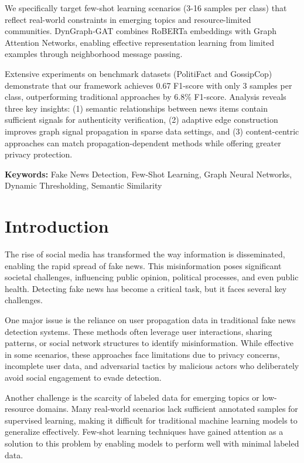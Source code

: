 \documentclass[conference]{IEEEtran}
\begin{document}
    We specifically target few-shot learning scenarios (3-16 samples per class) that reflect real-world constraints in emerging topics and resource-limited communities. DynGraph-GAT combines RoBERTa embeddings with Graph Attention Networks, enabling effective representation learning from limited examples through neighborhood message passing. 
    
    Extensive experiments on benchmark datasets (PolitiFact and GossipCop) demonstrate that our framework achieves 0.67 F1-score with only 3 samples per class, outperforming traditional approaches by 6.8\% F1-score. Analysis reveals three key insights: (1) semantic relationships between news items contain sufficient signals for authenticity verification, (2) adaptive edge construction improves graph signal propagation in sparse data settings, and (3) content-centric approaches can match propagation-dependent methods while offering greater privacy protection.
    
\textbf{Keywords:} Fake News Detection, Few-Shot Learning, Graph Neural Networks, Dynamic Thresholding, Semantic Similarity


\section{Introduction}
\label{sec:introduction}
The rise of social media has transformed the way information is disseminated, enabling the rapid spread of fake news. This misinformation poses significant societal challenges, influencing public opinion, political processes, and even public health. Detecting fake news has become a critical task, but it faces several key challenges.

One major issue is the reliance on user propagation data in traditional fake news detection systems. These methods often leverage user interactions, sharing patterns, or social network structures to identify misinformation. While effective in some scenarios, these approaches face limitations due to privacy concerns, incomplete user data, and adversarial tactics by malicious actors who deliberately avoid social engagement to evade detection.

Another challenge is the scarcity of labeled data for emerging topics or low-resource domains. Many real-world scenarios lack sufficient annotated samples for supervised learning, making it difficult for traditional machine learning models to generalize effectively. Few-shot learning techniques have gained attention as a solution to this problem by enabling models to perform well with minimal labeled data.
\end{document}
